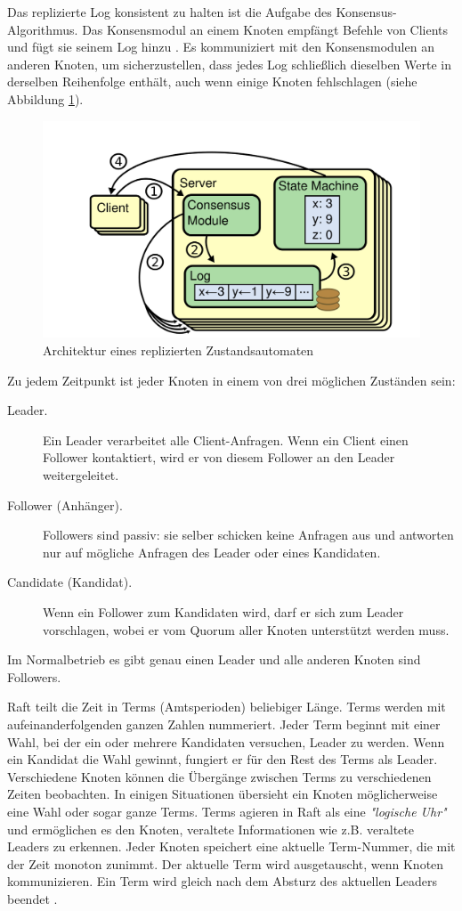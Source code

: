Das replizierte Log konsistent zu halten ist die Aufgabe des Konsensus-Algorithmus. Das Konsensmodul an einem Knoten empfängt Befehle von Clients und fügt sie seinem Log hinzu \cite{Ongaro14insearch}. Es kommuniziert mit den Konsensmodulen an anderen Knoten, um sicherzustellen, dass jedes Log schließlich dieselben Werte in derselben Reihenfolge enthält, auch wenn einige Knoten fehlschlagen (siehe Abbildung \ref{fig:rsm}).

\begin{figure}
	\centering
	\includegraphics[width=0.7\linewidth]{images/1_replicated_state_machine}
	\caption{Architektur eines replizierten Zustandsautomaten}
	\label{fig:rsm}
\end{figure}

Zu jedem Zeitpunkt ist jeder Knoten in einem von drei möglichen Zuständen sein:

\begin{description} 
	\item[Leader.] Ein Leader verarbeitet alle Client-Anfragen. Wenn ein Client einen Follower kontaktiert, wird er von diesem Follower an den Leader weitergeleitet.
	
	\item[Follower (Anhänger).] Followers sind passiv: sie selber schicken keine Anfragen aus und antworten nur auf mögliche Anfragen des Leader oder eines Kandidaten.
	
	\item[Candidate (Kandidat).] Wenn ein Follower zum Kandidaten wird, darf er sich zum Leader vorschlagen, wobei er vom Quorum aller Knoten unterstützt werden muss.
\end{description}

Im Normalbetrieb es gibt genau einen Leader und alle anderen Knoten sind Followers.

Raft teilt die Zeit in Terms (Amtsperioden) beliebiger Länge. Terms werden mit aufeinanderfolgenden ganzen Zahlen nummeriert. Jeder Term beginnt mit einer Wahl, bei der ein oder mehrere Kandidaten versuchen, Leader zu werden. Wenn ein Kandidat die Wahl gewinnt, fungiert er für den Rest des Terms als Leader. Verschiedene Knoten können die Übergänge zwischen Terms zu verschiedenen Zeiten beobachten. In einigen Situationen übersieht ein Knoten möglicherweise eine Wahl oder sogar ganze Terms. Terms agieren in Raft als eine \textit{"logische Uhr"} und ermöglichen es den Knoten, veraltete Informationen wie z.B. veraltete Leaders zu erkennen. Jeder Knoten speichert eine aktuelle Term-Nummer, die mit der Zeit monoton zunimmt. Der aktuelle Term wird ausgetauscht, wenn Knoten kommunizieren. Ein Term wird gleich nach dem Absturz des aktuellen Leaders beendet \cite{Ongaro14insearch}.

